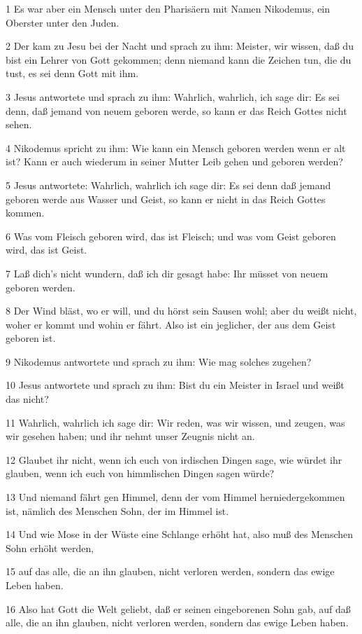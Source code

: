 \par 1 Es war aber ein Mensch unter den Pharisäern mit Namen Nikodemus, ein Oberster unter den Juden.
\par 2 Der kam zu Jesu bei der Nacht und sprach zu ihm: Meister, wir wissen, daß du bist ein Lehrer von Gott gekommen; denn niemand kann die Zeichen tun, die du tust, es sei denn Gott mit ihm.
\par 3 Jesus antwortete und sprach zu ihm: Wahrlich, wahrlich, ich sage dir: Es sei denn, daß jemand von neuem geboren werde, so kann er das Reich Gottes nicht sehen.
\par 4 Nikodemus spricht zu ihm: Wie kann ein Mensch geboren werden wenn er alt ist? Kann er auch wiederum in seiner Mutter Leib gehen und geboren werden?
\par 5 Jesus antwortete: Wahrlich, wahrlich ich sage dir: Es sei denn daß jemand geboren werde aus Wasser und Geist, so kann er nicht in das Reich Gottes kommen.
\par 6 Was vom Fleisch geboren wird, das ist Fleisch; und was vom Geist geboren wird, das ist Geist.
\par 7 Laß dich's nicht wundern, daß ich dir gesagt habe: Ihr müsset von neuem geboren werden.
\par 8 Der Wind bläst, wo er will, und du hörst sein Sausen wohl; aber du weißt nicht, woher er kommt und wohin er fährt. Also ist ein jeglicher, der aus dem Geist geboren ist.
\par 9 Nikodemus antwortete und sprach zu ihm: Wie mag solches zugehen?
\par 10 Jesus antwortete und sprach zu ihm: Bist du ein Meister in Israel und weißt das nicht?
\par 11 Wahrlich, wahrlich ich sage dir: Wir reden, was wir wissen, und zeugen, was wir gesehen haben; und ihr nehmt unser Zeugnis nicht an.
\par 12 Glaubet ihr nicht, wenn ich euch von irdischen Dingen sage, wie würdet ihr glauben, wenn ich euch von himmlischen Dingen sagen würde?
\par 13 Und niemand fährt gen Himmel, denn der vom Himmel herniedergekommen ist, nämlich des Menschen Sohn, der im Himmel ist.
\par 14 Und wie Mose in der Wüste eine Schlange erhöht hat, also muß des Menschen Sohn erhöht werden,
\par 15 auf das alle, die an ihn glauben, nicht verloren werden, sondern das ewige Leben haben.
\par 16 Also hat Gott die Welt geliebt, daß er seinen eingeborenen Sohn gab, auf daß alle, die an ihn glauben, nicht verloren werden, sondern das ewige Leben haben.
